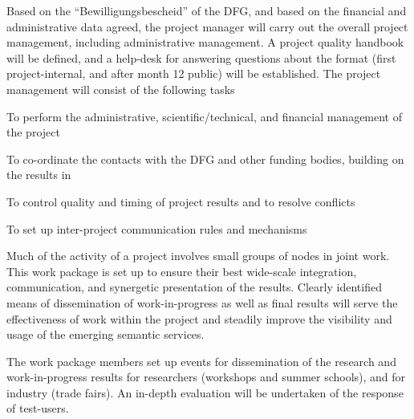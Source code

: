\begin{workplan}   
\begin{workpackage}[id=management,title=Project Management,wphases=1-24!.3,
 RM=2,RAM=8]
  Based on the ``Bewilligungsbescheid'' of the DFG, and based on the financial and
  administrative data agreed, the project manager will carry out the overall project
  management, including administrative management.  A project quality handbook will be
  defined, and a {\pn} help-desk for answering questions about the format (first
  project-internal, and after month 12 public) will be established. The project management
  will consist of the following tasks
\begin{tasklist}
\begin{task}[id=foo,wphases=0-3]%

  To perform the administrative, scientific/technical, and financial management of the
  project 
\end{task}
\begin{task}[id=bar,wphases=13-17!.5]

  To co-ordinate the contacts with the DFG and other funding bodies, building on the
  results in 
\end{task}
\begin{task}
  To control quality and timing of project results and to resolve conflicts
\end{task}
\begin{task}
  To set up inter-project communication rules and mechanisms
\end{task}
\end{tasklist}

\end{workpackage}

\begin{workpackage}[id=dissem,title=Dissemination and Exploitation,
RM=8]

Much of the activity of a project involves small groups of nodes in joint work. This work
 package is set up to ensure their best wide-scale integration, communication, and
 synergetic presentation of the results. Clearly identified means of dissemination of
 work-in-progress as well as final results will serve the effectiveness of work within the
 project and steadily improve the visibility and usage of the emerging semantic services.


 The work package members set up events for dissemination of the research and
 work-in-progress results for researchers (workshops and summer schools), and for industry
 (trade fairs). An in-depth evaluation will be undertaken of the response of test-users.
 

\end{workpackage}
\end{workplan}
